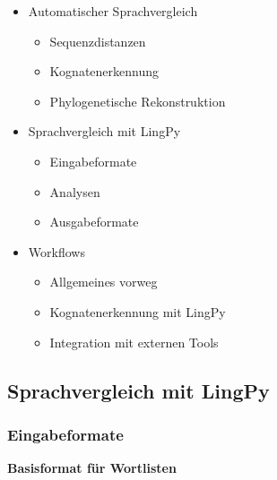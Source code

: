 \begin{itemize}
\itemsep1pt\parskip0pt
\item
  {Automatischer Sprachvergleich}

  \begin{itemize}
  \itemsep1pt\parskip0pt
  \item
    {Sequenzdistanzen}
  \item
    {Kognatenerkennung}
  \item
    {Phylogenetische Rekonstruktion}
  \end{itemize}
\item
  {Sprachvergleich mit LingPy}

  \begin{itemize}
  \itemsep1pt\parskip0pt
  \item
    {Eingabeformate}
  \item
    {Analysen}
  \item
    {Ausgabeformate}
  \end{itemize}
\item
  {Workflows}

  \begin{itemize}
  \itemsep1pt\parskip0pt
  \item
    {Allgemeines vorweg}
  \item
    {Kognatenerkennung mit LingPy}
  \item
    {Integration mit externen Tools}
  \end{itemize}
\end{itemize}

\subsection{\texorpdfstring{{Sprachvergleich mit
LingPy}}{Sprachvergleich mit LingPy}}

\subsubsection{\texorpdfstring{{Eingabeformate}}{Eingabeformate}}

\textbf{Basisformat für Wortlisten}

